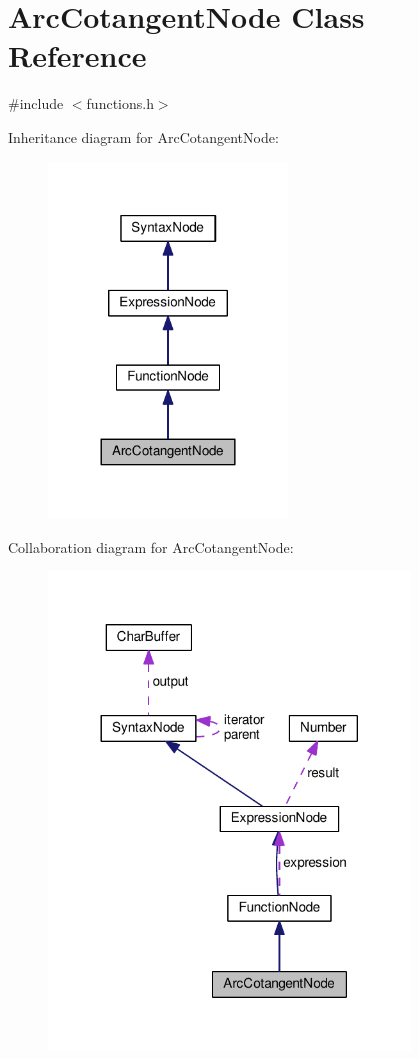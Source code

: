 \hypertarget{classArcCotangentNode}{}\section{Arc\+Cotangent\+Node Class Reference}
\label{classArcCotangentNode}


{\ttfamily \#include $<$functions.\+h$>$}



Inheritance diagram for Arc\+Cotangent\+Node\+:\nopagebreak
\begin{figure}[H]
\begin{center}
\leavevmode
\includegraphics[width=180pt]{classArcCotangentNode__inherit__graph}
\end{center}
\end{figure}


Collaboration diagram for Arc\+Cotangent\+Node\+:\nopagebreak
\begin{figure}[H]
\begin{center}
\leavevmode
\includegraphics[width=272pt]{classArcCotangentNode__coll__graph}
\end{center}
\end{figure}
